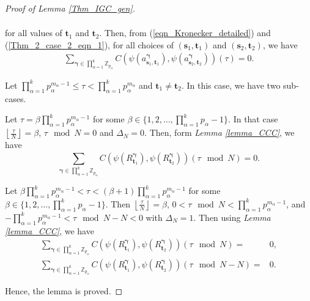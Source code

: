 \documentclass[pdflatex,sn-mathphys-num]{sn-jnl}%
\theoremstyle{thmstyleone}
\newcommand{\floor}[1]{\left\lfloor #1 \right\rfloor}
\begin{document}
\begin{proof}[Proof of Lemma \ref{Thm_IGC_gen}]
\begin{mycases}
\begin{equation}
\begin{split}
				\end{split}
			\end{equation}
			for all values of $\mathbf{t}_1$ and $\mathbf{t}_2$. Then, from (\ref{eqn_Kronecker_detailed}) and (\ref{Thm_2_case_2_eqn_1}), for all choices of $\left( \mathbf{s}_1, \mathbf{t}_1\right)$ and $\left( \mathbf{s}_2, \mathbf{t}_2\right)$, we have
			\begin{equation}
				\begin{split}
					\sum_{\bm{\gamma} \in \prod_{\alpha=1}^{k} \mathbb{Z}_{p_\alpha}}^{}  C\left( \psi(a_{\mathbf{s}_1,\mathbf{t}_1}^{\bm{\gamma}} ), \psi(a_{\mathbf{s}_2,\mathbf{t}_2}^{\bm{\gamma}} ) \right) (\tau)=0.
				\end{split}
			\end{equation}
			\item Let $\prod_{\alpha=1}^{k} p_\alpha^{m_\alpha-1} \leq \tau < \prod_{\alpha=1}^{k} p_\alpha^{m_\alpha}$ and $\mathbf{t}_1 \neq \mathbf{t}_2$. In this case, we have two sub-cases.
			\begin{mysubcases}
				\item  Let $\tau = \beta \prod_{\alpha=1}^{k} p_\alpha^{m_\alpha-1}$ for some $\beta \in \{1,2, \dots, \prod_{\alpha=1}^{k} p_\alpha-1\}$. In that case $\floor{\frac{\tau}{N}}=\beta$,  $\tau \mod N = 0$ and $\Delta_N=0$. Then, form \textit{Lemma \ref{lemma_CCC}}, we have
				\begin{equation}\label{Thm_2_case_3_subcase_1_eqn_1}
					\sum_{\bm{\gamma} \in \prod_{\alpha=1}^{k} \mathbb{Z}_{p_\alpha}}^{} C \left( \psi (R_{\mathbf{t}_1}^{\bm{\gamma}} ), \psi (R_{\mathbf{t}_2}^{\bm{\gamma}} ) \right) \left(\tau \mod N \right)=0.
				\end{equation}
				\item Let $\beta \prod_{\alpha=1}^{k} p_\alpha^{m_\alpha-1} < \tau < (\beta+1) \prod_{\alpha=1}^{k} p_\alpha^{m_\alpha-1}$ for some $\beta \in \{1,2, \dots, \prod_{\alpha=1}^{k} p_\alpha-1\}$. Then $\floor{\frac{\tau}{N}}= \beta$, $0 < \tau \mod N  < \prod_{\alpha=1}^{k} p_\alpha^{m_\alpha-1}$, and  $-\prod_{\alpha=1}^{k} p_\alpha^{m_\alpha-1}< \tau \mod N-N <0 $ with $\Delta_N=1$. Then using \textit{Lemma \ref{lemma_CCC}}, we have
				\begin{equation}\label{Thm_2_case_3_subcase_2_eqn_1}
					\begin{split}
						\sum_{\bm{\gamma} \in \prod_{\alpha=1}^{k} \mathbb{Z}_{p_\alpha}}^{} C \left( \psi (R_{\mathbf{t}_1}^{\bm{\gamma}} ), \psi (R_{\mathbf{t}_2}^{\bm{\gamma}} ) \right) \left(\tau  \mod N \right)=& 0,\\
						\sum_{\bm{\gamma} \in \prod_{\alpha=1}^{k} \mathbb{Z}_{p_\alpha}}^{}  C \left( \psi (R_{\mathbf{t}_1}^{\bm{\gamma}} ), \psi (R_{\mathbf{t}_2}^{\bm{\gamma}} ) \right) \left(\tau  \mod N-N \right)= &0.
					\end{split}
				\end{equation}
			\end{mysubcases}
		\end{mycases}
		Hence, the lemma is proved.
	\end{proof}
\end{document}

